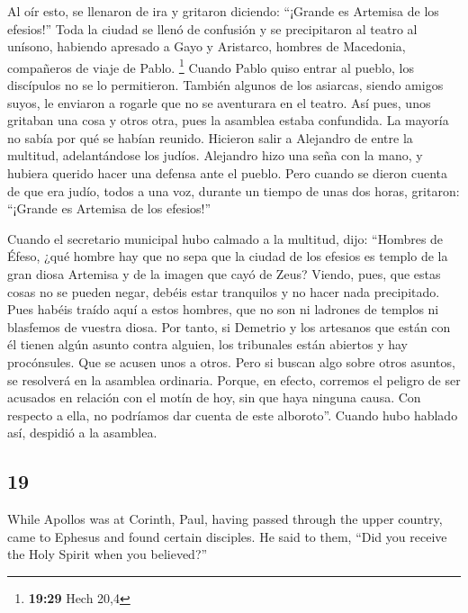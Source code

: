 \begin{paracol}{2}
 Al oír esto, se llenaron de ira y gritaron diciendo:
``¡Grande es Artemisa de los efesios!''  Toda la ciudad
se llenó de confusión y se precipitaron al teatro al unísono, habiendo
apresado a Gayo y Aristarco, hombres de Macedonia, compañeros de viaje
de Pablo. \footnote{\textbf{19:29} Hech 20,4}  Cuando
Pablo quiso entrar al pueblo, los discípulos no se lo permitieron.
 También algunos de los asiarcas, siendo amigos suyos, le
enviaron a rogarle que no se aventurara en el teatro. 
Así pues, unos gritaban una cosa y otros otra, pues la asamblea estaba
confundida. La mayoría no sabía por qué se habían reunido.
 Hicieron salir a Alejandro de entre la multitud,
adelantándose los judíos. Alejandro hizo una seña con la mano, y hubiera
querido hacer una defensa ante el pueblo.  Pero cuando se
dieron cuenta de que era judío, todos a una voz, durante un tiempo de
unas dos horas, gritaron: ``¡Grande es Artemisa de los efesios!''

 Cuando el secretario municipal hubo calmado a la
multitud, dijo: ``Hombres de Éfeso, ¿qué hombre hay que no sepa que la
ciudad de los efesios es templo de la gran diosa Artemisa y de la imagen
que cayó de Zeus?  Viendo, pues, que estas cosas no se
pueden negar, debéis estar tranquilos y no hacer nada precipitado.
 Pues habéis traído aquí a estos hombres, que no son ni
ladrones de templos ni blasfemos de vuestra diosa.  Por
tanto, si Demetrio y los artesanos que están con él tienen algún asunto
contra alguien, los tribunales están abiertos y hay procónsules. Que se
acusen unos a otros.  Pero si buscan algo sobre otros
asuntos, se resolverá en la asamblea ordinaria.  Porque,
en efecto, corremos el peligro de ser acusados en relación con el motín
de hoy, sin que haya ninguna causa. Con respecto a ella, no podríamos
dar cuenta de este alboroto''.  Cuando hubo hablado así,
despidió a la asamblea.

\switchcolumn
\begin{otherlanguage}{english}

\hypertarget{section-37}{%
\section{19}\label{section-37}}

 While Apollos was at Corinth, Paul, having passed through
the upper country, came to Ephesus and found certain disciples.
 He said to them, ``Did you receive the Holy Spirit when
you believed?''


\end{otherlanguage}
\end{paracol}
